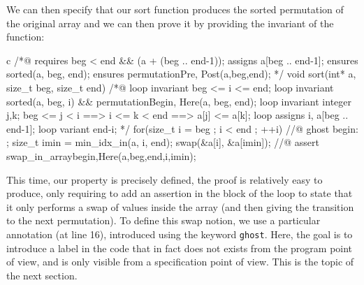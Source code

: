 We can then specify that our sort function produces the sorted
permutation of the original array and we can then prove it by providing
the invariant of the function:



\begin{CodeBlock}{c}
/*@
  requires beg < end && \valid(a + (beg .. end-1));
  assigns  a[beg .. end-1];  
  ensures sorted(a, beg, end);
  ensures permutation{Pre, Post}(a,beg,end);
*/
void sort(int* a, size_t beg, size_t end){
  /*@
    loop invariant beg <= i <= end;
    loop invariant sorted(a, beg, i) && permutation{Begin, Here}(a, beg, end);
    loop invariant \forall integer j,k; beg <= j < i ==> i <= k < end ==> a[j] <= a[k];
    loop assigns i, a[beg .. end-1];
    loop variant end-i;
  */
  for(size_t i = beg ; i < end ; ++i){
    //@ ghost begin: ;
    size_t imin = min_idx_in(a, i, end);
    swap(&a[i], &a[imin]);
    //@ assert swap_in_array{begin,Here}(a,beg,end,i,imin);
  }
}
\end{CodeBlock}



This time, our property is precisely defined, the proof is relatively
easy to produce, only requiring to add an assertion in the block of the
loop to state that it only performs a swap of values inside the array
(and then giving the transition to the next permutation). To define this
swap notion, we use a particular annotation (at line 16), introduced
using the keyword \texttt{ghost}. Here, the goal is to introduce a label
in the code that in fact does not exists from the program point of view,
and is only visible from a specification point of view. This is the
topic of the next section.
